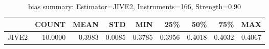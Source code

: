 \begin{table}[ht]
\centering
\caption{bias summary: Estimator=JIVE2, Instruments=166, Strength=0.90}
\begin{tabular}{lrrrrrrrr}
\toprule
 & COUNT & MEAN & STD & MIN & 25\% & 50\% & 75\% & MAX \\
\midrule
JIVE2 & 10.0000 & 0.3983 & 0.0085 & 0.3785 & 0.3956 & 0.4018 & 0.4032 & 0.4067 \\
\bottomrule
\end{tabular}
\end{table}
